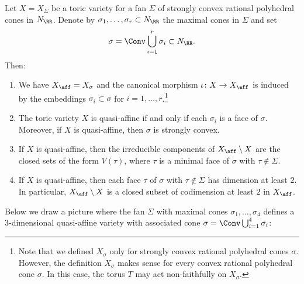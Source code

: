 \begin{lemma}
\label{lem.toric_qusi-affine}
Let $X = X_{\Sigma}$ be a toric variety for a fan $\Sigma$ of strongly convex rational
polyhedral cones in $N_{\RR}$. Denote by $\sigma_1, \ldots, \sigma_r \subset N_{\RR}$
the maximal cones in $\Sigma$ and set
\[
\sigma = \Conv \bigcup_{i=1}^r \sigma_i \subset N_{\RR}.
\]
Then:
\begin{enumerate}
\item \label{lem.toric_qusi-affine1} We have $X_{\aff} = X_\sigma$
and the canonical morphism $\iota \colon X \to X_{\aff}$
is induced by the embeddings $\sigma_i \subset \sigma$ for $i=1, \ldots, r$.\footnote{Note that we defined $X_{\sigma}$ only for strongly convex rational polyhedral
cones $\sigma$. However, the definition $X_{\sigma}$ makes sense for every convex rational polyhedral
cone $\sigma$. In this case, the torus $T$ may act non-faithfully on $X_\sigma$.}
\item \label{lem.toric_qusi-affine2}
The toric variety $X$ is quasi-affine if and only if each $\sigma_i$ is a face of $\sigma$.
Moreover, if $X$ is quasi-affine, then $\sigma$ is strongly convex.
\item \label{lem.toric_qusi-affine3}
If $X$ is quasi-affine, then the irreducible components of $X_{\aff} \setminus X$ are the
closed sets of the form $V(\tau)$, where $\tau$ is a minimal face of $\sigma$ with $\tau \not\in \Sigma$.
\item \label{lem.toric_qusi-affine4}
If $X$ is quasi-affine, then each face $\tau$ of $\sigma$ with $\tau \not\in \Sigma$
has dimension at least $2$. In particular,
$X_{\aff} \setminus X$ is a closed subset of codimension at least $2$
in $X_{\aff}$.
\end{enumerate}
\end{lemma}

Below we draw a picture where the fan $\Sigma$ with maximal cones $\sigma_1, \ldots, \sigma_4$
defines a $3$-dimensional quasi-affine variety with associated cone
$\sigma = \Conv \bigcup_{i=1}^4 \sigma_i$:\vspace*{5pt}

